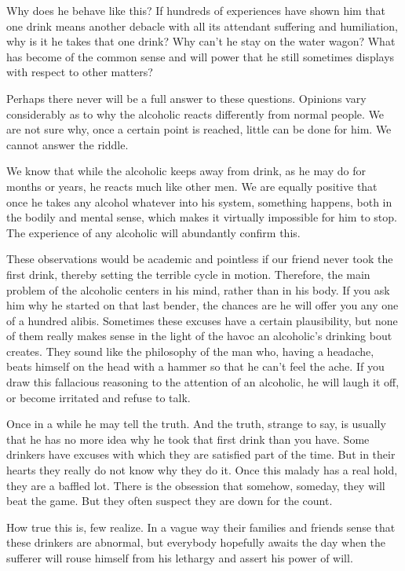 \begin{biblechapter}
    Why does he behave like this? 
\verse If hundreds of experiences have shown him 
    that one drink means another debacle 
    with all its attendant suffering and humiliation, 
    why is it he takes that one drink? 
\verse Why can't he stay on the water wagon? 
\verse What has become of the common sense and will power 
    that he still sometimes displays with respect to other matters?

\verse Perhaps there never will be a full answer to these questions. 
\verse Opinions vary considerably as to why the alcoholic 
    reacts differently from normal people. 
\verse We are not sure why, 
    once a certain point is reached, 
    little can be done for him. 
\verse We cannot answer the riddle.

\verse We know that while the alcoholic keeps away from drink, 
    as he may do for months or years, 
    he reacts much like other men. 
\verse We are equally positive that once he takes any alcohol 
    whatever into his system, something happens, 
    both in the bodily and mental sense, 
    which makes it virtually impossible for him to stop. 
\verse The experience of any alcoholic will abundantly confirm this.

\verse These observations would be academic and pointless 
    if our friend never took the first drink, 
    thereby setting the terrible cycle in motion. 
\verse Therefore, the main problem of the alcoholic centers in his mind, 
    rather than in his body. 
\verse If you ask him why he started on that last bender, 
    the chances are he will offer you any one of a hundred alibis. 
\verse Sometimes these excuses have a certain plausibility, 
    but none of them really makes sense 
    in the light of the havoc an alcoholic's drinking bout creates. 
\verse They sound like the philosophy of the man who, having a headache, 
    beats himself on the head with a hammer so that he can't feel the ache. 
\verse If you draw this fallacious reasoning 
    to the attention of an alcoholic, 
    he will laugh it off, 
    or become irritated and refuse to talk.

\verse Once in a while he may tell the truth. 
\verse And the truth, strange to say, 
    is usually that he has no more idea why he took that first drink 
    than you have. 
\verse Some drinkers have excuses with which they are satisfied part of the time. 
\verse But in their hearts they really do not know why they do it. 
\verse Once this malady has a real hold, they are a baffled lot. 
\verse There is the obsession that somehow, someday, 
    they will beat the game. 
\verse But they often suspect they are down for the count.

\verse How true this is, few realize. 
\verse In a vague way their families and friends sense 
    that these drinkers are abnormal, 
    but everybody hopefully awaits the day 
    when the sufferer will rouse himself from his lethargy 
    and assert his power of will.
\end{biblechapter}



